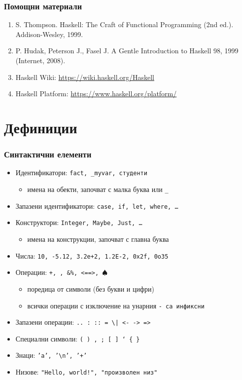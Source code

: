 \documentclass{beamer}
\begin{document}
\begin{frame}
  \frametitle{Помощни материали}
  \begin{enumerate}
  \item S. Thompson. Haskell: The Craft of Functional Programming (2nd ed.). Addison-Wesley, 1999.
  \item P. Hudak, Peterson J., Fasel J. A Gentle Introduction to Haskell 98, 1999 (Internet, 2008).
  \item Haskell Wiki: \url{https://wiki.haskell.org/Haskell}
  \item Haskell Platform: \url{https://www.haskell.org/platform/}
  \end{enumerate}
\end{frame}

\section{Дефиниции}

\begin{frame}
  \frametitle{Синтактични елементи}
  \begin{itemize}
  \item Идентификатори: \tt{fact}, \tt{\_myvar}, \tt{студенти}
    \begin{itemize}
    \item имена на обекти, започват с малка буква или \tt\_
    \end{itemize}
  \item Запазени идентификатори: \tt{case}, \tt{if}, \tt{let}, \tt{where}, \ldots
  \item Конструктори: \tt{Integer}, \tt{Maybe}, \tt{Just}, \ldots
    \begin{itemize}
    \item имена на конструкции, започват с главна буква
    \end{itemize}
  \item Числа: \tt{10}, \tt{-5.12}, \tt{3.2e+2}, \tt{1.2E-2}, \tt{0x2f}, \tt{0o35}
  \item Операции: \tt+, \tt*, \tt{\&\%}, \tt{<==>}, \tt{$\spadesuit$}
    \begin{itemize}
    \item поредица от символи (без букви и цифри)
    \item всички операции с изключение на унарния \tt- са инфиксни
    \end{itemize}
  \item Запазени операции: \tt{..} \tt: \tt{::} \tt= \tt\textbackslash \tt| \tt{<-} \tt{->} \tt@ \tt\~ \tt{=>}
  \item Специални символи: \tt( \tt) \tt, \tt; \tt[ \tt] \tt` \tt\{ \tt\}
  \item Знаци: \tt{'a'}, \tt{'\textbackslash n'}, \tt{'+'}
  \item Низове: \tt{"Hello, world!"}, \tt{"произволен низ"}
  \end{itemize}
\end{frame}
\end{document}
